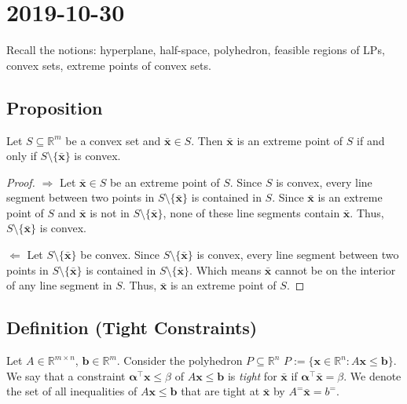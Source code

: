 \section{2019-10-30}
Recall the notions: hyperplane, half-space, polyhedron,
feasible regions of LPs, convex sets, extreme points
of convex sets.

\begin{thmbox}
    \subsection{Proposition}
    Let $ S\subseteq \mathbb{R}^m $ be a convex set and $ \bm{\bar{x}}\in S $. Then $ \bm{\bar{x}} $ is an extreme point of $ S $ if and only if
    $ S\setminus \{\bm{\bar{x}}\} $ is convex.
\end{thmbox}
\begin{proof}
    $\Rightarrow$ Let $ \bm{\bar{x}}\in S $ be an extreme point of $ S $. 
    Since $ S $ is
    convex, every line segment between two points in
    $ S\setminus \{\bm{\bar{x}}\} $ is contained in $ S $. Since
    $ \bm{\bar{x}} $ is an extreme point of $ S $ and $ \bm{\bar{x}} $
    is not in $ S\setminus \{\bm{\bar{x}}\} $, none of these line segments
    contain $ \bm{\bar{x}} $. Thus, $ S\setminus \{\bm{\bar{x}}\} $ is convex.

    $\Leftarrow$ Let $ S\setminus \{\bm{\bar{x}}\} $ be convex. 
    Since $ S\setminus \{\bm{\bar{x}}\} $ is convex, every
    line segment between two points in $ S\setminus \{\bm{\bar{x}}\} $ is
    contained in $ S\setminus \{\bm{\bar{x}}\} $. Which means $ \bm{\bar{x}} $
    cannot be on the interior of any line segment in $ S $. Thus,
    $ \bm{\bar{x}} $ is an extreme point of $ S $.
\end{proof}

\begin{defbox}
    \subsection{Definition (Tight Constraints)}
    Let $ A\in \mathbb{R}^{m \times n} $, $ \bm{b}\in \mathbb{R}^m $. Consider
    the polyhedron $ P\subseteq \mathbb{R}^n $
    $ P:=\{\bm{x}\in\mathbb{R}^n:A\bm{x}\le \bm{b}\} $. We say
    that a constraint $ \bm{\alpha ^\top} \bm{x}\le \beta $ of
    $ A \bm{x}\le \bm{b} $ is \emph{tight} for $ \bm{\bar{x}} $ if
    $ \bm{\alpha}^\top \bm{\bar{x}}=\beta $. We denote the set of all
    inequalities of $ A \bm{x}\le \bm{b} $ that
    are tight at $ \bm{\bar{x}} $ by $ A^=\bm{\bar{x}}=b^= $.
\end{defbox}


